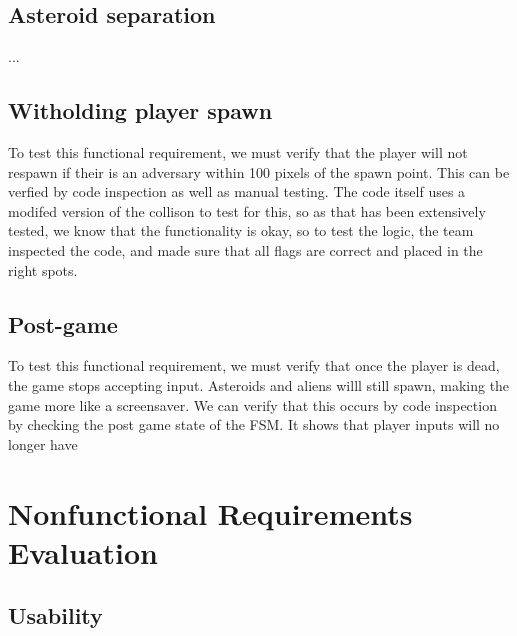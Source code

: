 \documentclass[12pt, titlepage]{article}
\begin{document}
\subsection{Asteroid separation}
...\\
\subsection{Witholding player spawn}
To test this functional requirement, we must verify that the player will not respawn if their is an adversary within 100 pixels of the spawn point. This can be verfied by code inspection as well as manual testing. The code itself uses a modifed version of the collison to test for this, so as that has been extensively tested, we know that the functionality is okay, so to test the logic, the team inspected the code, and made sure that all flags are correct and placed in the right spots.
\subsection{Post-game}
To test this functional requirement, we must verify that once the player is dead, the game stops accepting input. Asteroids and aliens willl still spawn, making the game more like a screensaver. We can verify that this occurs by code inspection by checking the post game state of the FSM. It shows that player inputs will no longer have 


\section{Nonfunctional Requirements Evaluation}

\subsection{Usability}
\end{document}
